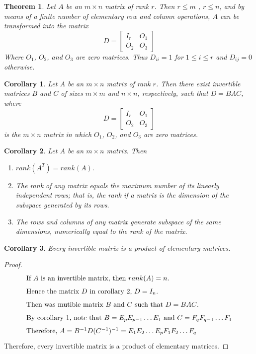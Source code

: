 \documentclass[10pt, oneside]{article}
\newtheorem{thm}{Theorem}
\newtheorem{cor}{Corollary}
\begin{document}
\begin{thm}
	Let $A$ be an $m \times n$ matrix of rank $r$. Then $r \leq m$ , $r \leq n$, and by means of a finite number of elementary row and column operations, $A$ can be transformed into the matrix
	\[
		D = \begin{bmatrix} I_r & O_1 \\ O_2 & O_3 \end{bmatrix}
	\]
	Where $O_1$, $O_2$, and $O_3$ are zero matrices. Thus $D_{ii} = 1$ for $1 \leq i \leq r$ and $D_{ij} = 0$ otherwise.
\end{thm}

\begin{cor}
	Let $A$ be an $m \times n$ matrix of rank $r$. Then there exist invertible matrices $B$ and $C$ of sizes $m \times m$ and $n \times n$, respectively, such that $D = BAC$, where
	\[
		D = \begin{bmatrix} I_r & O_1 \\ O_2 & O_3 \end{bmatrix}
	\]
	is the $m \times n$ matrix in which $O_1$, $O_2$, and $O_3$ are zero matrices.
\end{cor}

\begin{cor}
	Let $A$ be an $m \times n$ matrix. Then
	\begin{enumerate}
		\item $rank(A^T) = rank(A)$.
		\item The rank of any matrix equals the maximum number of its linearly independent rows; that is, the rank if a matrix is the dimension of the subspace generated by its rows.
		\item The rows and columns of  any matrix generate subspace of the same dimensions, numerically equal to the rank of the matrix.
	\end{enumerate}
\end{cor}

\begin{cor}
	Every invertible matrix is a product of elementary matrices.
\end{cor}

\begin{proof}
	\begin{align*}
		\intertext{If $A$ is an invertible matrix, then $rank(A) = n$.}
		\intertext{Hence the matrix $D$ in corollary 2, $D = I_n$.}
		\intertext{Then was mutible matrix $B$ and $C$ such that $D = BAC$.}
		\intertext{By corollary 1, note that $B = E_pE_{p-1} \ldots E_1$ and $C = F_qF_{q-1} \ldots F_1$}
		\intertext{Therefore, $A = B^{-1}D(C^{-1})^{-1} = E_1E_2 \ldots E_pF_1F_2 \ldots F_q$}
	\end{align*}
	Therefore, every invertible matrix is a product of elementary matrices.
\end{proof}
\end{document}
